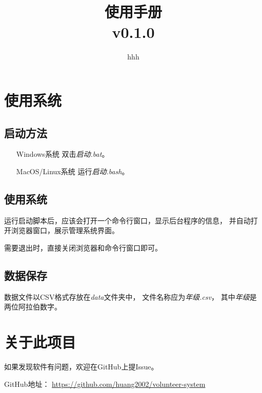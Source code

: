 \documentclass[12pt,titlepage]{article}
\title{\systemname\\使用手册\\v0.1.0}
\author{hhh}
\begin{document}
\maketitle

\tableofcontents
\thispagestyle{empty}
\setcounter{page}{0}

\pagestyle{headings}

\newpage
\section{使用系统}

\subsection{启动方法}

\begin{itemize}
    \item[Windows系统] 双击\textit{启动.bat}。
    \item[MacOS/Linux系统] 运行\textit{启动.bash}。
\end{itemize}

\subsection{使用系统}

运行启动脚本后，应该会打开一个命令行窗口，显示后台程序的信息，
并自动打开浏览器窗口，展示管理系统界面。

需要退出时，直接关闭浏览器和命令行窗口即可。

\subsection{数据保存}

数据文件以CSV格式存放在\textit{data}文件夹中，
文件名称应为\textit{年级.csv}，
其中\textit{年级}是两位阿拉伯数字。

\newpage
\section{关于此项目}

如果发现软件有问题，欢迎在GitHub上提Issue。

GitHub地址：
\url{https://github.com/huang2002/volunteer-system}
\end{document}
